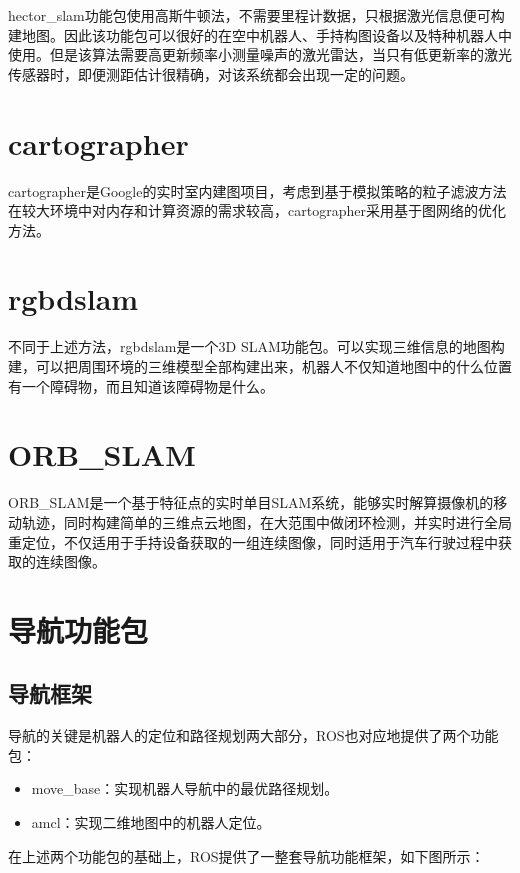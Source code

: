 \documentclass[9pt, oneside]{book}
\begin{document}
hector\_slam功能包使用高斯牛顿法，不需要里程计数据，只根据激光信息便可构建地图。因此该功能包可以很好的在空中机器人、手持构图设备以及特种机器人中使用。但是该算法需要高更新频率小测量噪声的激光雷达，当只有低更新率的激光传感器时，即便测距估计很精确，对该系统都会出现一定的问题。

\section{cartographer}

cartographer是Google的实时室内建图项目，考虑到基于模拟策略的粒子滤波方法在较大环境中对内存和计算资源的需求较高，cartographer采用基于图网络的优化方法。

\section{rgbdslam}

不同于上述方法，rgbdslam是一个3D SLAM功能包。可以实现三维信息的地图构建，可以把周围环境的三维模型全部构建出来，机器人不仅知道地图中的什么位置有一个障碍物，而且知道该障碍物是什么。

\section{ORB\_SLAM}

ORB\_SLAM是一个基于特征点的实时单目SLAM系统，能够实时解算摄像机的移动轨迹，同时构建简单的三维点云地图，在大范围中做闭环检测，并实时进行全局重定位，不仅适用于手持设备获取的一组连续图像，同时适用于汽车行驶过程中获取的连续图像。

\section{导航功能包}

\subsection{导航框架}

导航的关键是机器人的定位和路径规划两大部分，ROS也对应地提供了两个功能包：

\begin{itemize}
    \item move\_base：实现机器人导航中的最优路径规划。
    \item amcl：实现二维地图中的机器人定位。
\end{itemize}

在上述两个功能包的基础上，ROS提供了一整套导航功能框架，如下图所示：
\end{document}
